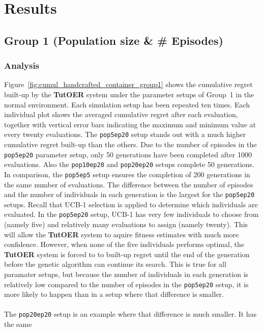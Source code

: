 \section{Results}
\label{sec:simulations_results}
\subsection{Group 1 (Population size \& \# Episodes)}
\subsubsection*{Analysis}
Figure~\ref{fig:cumul_handcrafted_container_group1} shows the cumulative
regret built-up by the \textbf{TutOER} system under the parameter setups of Group~1
in the normal environment. Each simulation setup has
been repeated ten times. Each individual plot shows the averaged cumulative
regret after each evaluation, together with vertical error bars indicating the
maximum and minimum value at every twenty evaluations. The \texttt{pop5ep20} setup stands out with a
much higher cumulative regret built-up than the others. Due to the number of episodes in the
\texttt{pop5ep20} parameter setup, only 50 generations have been completed after
1000 evaluations. Also the \texttt{pop10ep20} and \texttt{pop20ep20} setups complete
50 generations. In comparison, the \texttt{pop5ep5} setup ensures the completion
of 200 generations in the same number of evaluations. The difference between
the number of episodes and the number of individuals in each generation is the
largest for the \texttt{pop5ep20} setups. Recall that UCB-1 selection is applied
to determine which individuals are evaluated. In the \texttt{pop5ep20} setup,
UCB-1 has very few individuals to choose from (namely five) and relatively many
evaluations to assign (namely twenty). This will allow the \textbf{TutOER} system
to aquire fitness estimates with much more confidence. However, when none of
the five individuals performs optimal, the \textbf{TutOER} system is forced to
to built-up regret until the end of the generation before the genetic algorithm
can continue its search. This is true for all paramater setups, but
because the number of individuals in each generation is relatively low compared
to the number of episodes in the \texttt{pop5ep20} setup, it is more likely to
happen than in a setup where that difference is smaller.\\\\
\noindent
The \texttt{pop20ep20}
setup is an example where that difference is much smaller. It has the same
